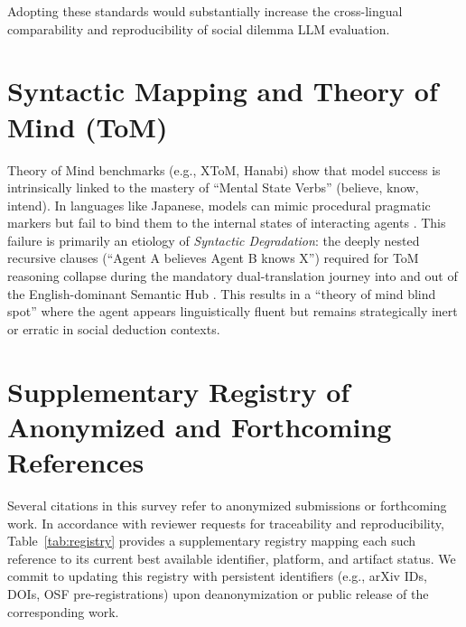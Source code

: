 \documentclass[11pt]{article}
\begin{document}
\noindent Adopting these standards would substantially increase the cross-lingual comparability and reproducibility of social dilemma LLM evaluation.

\section{Syntactic Mapping and Theory of Mind (ToM)}
\label{app:tom}
Theory of Mind benchmarks (e.g., XToM, Hanabi) show that model success is intrinsically linked to the mastery of ``Mental State Verbs'' (believe, know, intend). In languages like Japanese, models can mimic procedural pragmatic markers but fail to bind them to the internal states of interacting agents \citep{milani2022pragmatic}. This failure is primarily an etiology of \textit{Syntactic Degradation}: the deeply nested recursive clauses (``Agent A believes Agent B knows X'') required for ToM reasoning collapse during the mandatory dual-translation journey into and out of the English-dominant Semantic Hub \citep{wu2024semantichub}. This results in a ``theory of mind blind spot'' where the agent appears linguistically fluent but remains strategically inert or erratic in social deduction contexts.

\section{Supplementary Registry of Anonymized and Forthcoming References}
\label{app:registry}

Several citations in this survey refer to anonymized submissions or forthcoming work. In accordance with reviewer requests for traceability and reproducibility, Table~\ref{tab:registry} provides a supplementary registry mapping each such reference to its current best available identifier, platform, and artifact status. We commit to updating this registry with persistent identifiers (e.g., arXiv IDs, DOIs, OSF pre-registrations) upon deanonymization or public release of the corresponding work.
\end{document}
